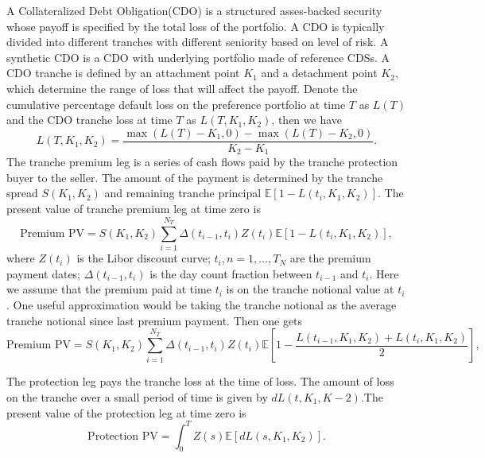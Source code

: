 \documentclass[11pt,a4paper]{article}
\theoremstyle{definition}
\numberwithin{equation}{section}
\begin{document}
	A Collateralized Debt Obligation(CDO) is a structured asses-backed security whose payoff is specified by the total loss of the portfolio. A CDO is typically divided into different tranches with different seniority based on level of risk. A synthetic CDO is a CDO with underlying portfolio made of reference CDSs. A CDO tranche is defined by an attachment point $K_1$ and a detachment point $K_2$, which determine the range of loss that will affect the payoff. Denote the cumulative percentage default loss on the preference portfolio at time $T$ as $L(T)$ and the CDO tranche loss at time $T$ as $L(T, K_1, K_2)$, then we have
	\begin{equation}
	L(T, K_1, K_2) = \frac{\max(L(T)-K_1,0)-\max(L(T)-K_2,0)}{K_2-K_1}.
	\end{equation}
	The tranche premium leg is a series of cash flows paid by the tranche protection buyer to the seller. The amount of the payment is determined by the tranche spread $S(K_1,K_2)$ and remaining tranche principal $\mathbb E[1-L(t_i, K_1, K_2)]$.
	The present value of tranche premium leg at time zero is
	\begin{equation}
	\text{Premium PV} = S(K_1,K_2)\sum_{i=1}^{N_T}\Delta(t_{i-1},t_i)Z(t_i)\mathbb E[1-L(t_i, K_1, K_2)],
	\end{equation}
	where $Z(t_i)$ is the Libor discount curve; $t_i, n = 1,...,T_N$ are the premium payment dates; $\Delta(t_{i-1},t_i)$ is the day count fraction between $t_{i-1}$ and $t_i$. Here we assume that the premium paid at time $t_i$ is on the tranche notional value at $t_i$. One useful approximation would be taking the tranche notional as the average tranche notional since last premium payment. Then one gets
	\begin{equation}
	\text{Premium PV} = S(K_1,K_2)\sum_{i=1}^{N_T}\Delta(t_{i-1},t_i)Z(t_i)\mathbb E\left[1-\frac{L(t_{i-1}, K_1, K_2)+L(t_i, K_1, K_2)}{2}\right],
	\end{equation}
	
	
	The protection leg pays the tranche loss at the time of loss. The amount of loss on the tranche over a small period of time is given by $dL(t,K_1,K-2)$.The present value of the protection leg at time zero is 
	\begin{equation}
	\text{Protection PV} = \int_{0}^{T}Z(s)\mathbb E[dL(s,K_1,K_2)].
	\end{equation}
	
\end{document}
